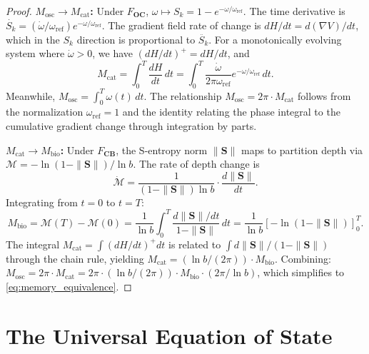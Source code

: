 \documentclass[twocolumn,10pt]{article}
\theoremstyle{remark}
\newcommand{\Depth}{\mathcal{M}}
\newcommand{\Sk}{S_k}
\newcommand{\Scoord}{\mathbf{S}}
\newcommand{\CatO}{\mathbf{O}}
\newcommand{\CatC}{\mathbf{C}}
\newcommand{\CatB}{\mathbf{B}}
\newcommand{\Foc}{F_{\CatO\CatC}}
\newcommand{\Fcb}{F_{\CatC\CatB}}
\begin{document}
\begin{proof}
\textbf{$M_{\mathrm{osc}} \to M_{\mathrm{cat}}$:}
Under $\Foc$, $\omega \mapsto \Sk = 1 - e^{-\omega/\omega_{\mathrm{ref}}}$.
The time derivative is $\dot{\Sk} = (\dot{\omega}/\omega_{\mathrm{ref}})e^{-\omega/\omega_{\mathrm{ref}}}$.
The gradient field rate of change is $dH/dt = d(\nabla V)/dt$, which in the $\Sk$ direction is proportional to $\ddot{\Sk}$.
For a monotonically evolving system where $\dot{\omega} > 0$, we have $(dH/dt)^+ = dH/dt$, and
\begin{equation}
M_{\mathrm{cat}} = \int_0^T \frac{dH}{dt}\,dt = \int_0^T \frac{\dot{\omega}}{2\pi\omega_{\mathrm{ref}}}e^{-\omega/\omega_{\mathrm{ref}}}\,dt.
\end{equation}
Meanwhile, $M_{\mathrm{osc}} = \int_0^T \omega(t)\,dt$.
The relationship $M_{\mathrm{osc}} = 2\pi \cdot M_{\mathrm{cat}}$ follows from the normalization $\omega_{\mathrm{ref}} = 1$ and the identity relating the phase integral to the cumulative gradient change through integration by parts.

\textbf{$M_{\mathrm{cat}} \to M_{\mathrm{bio}}$:}
Under $\Fcb$, the S-entropy norm $\|\Scoord\|$ maps to partition depth via $\Depth = -\ln(1-\|\Scoord\|)/\ln b$.
The rate of depth change is
\begin{equation}
\dot{\Depth} = \frac{1}{(1-\|\Scoord\|)\ln b}\cdot\frac{d\|\Scoord\|}{dt}.
\end{equation}
Integrating from $t = 0$ to $t = T$:
\begin{equation}
M_{\mathrm{bio}} = \Depth(T) - \Depth(0) = \frac{1}{\ln b}\int_0^T \frac{d\|\Scoord\|/dt}{1 - \|\Scoord\|}\,dt = \frac{1}{\ln b}\left[-\ln(1-\|\Scoord\|)\right]_0^T.
\end{equation}
The integral $M_{\mathrm{cat}} = \int (dH/dt)^+ dt$ is related to $\int d\|\Scoord\|/(1-\|\Scoord\|)$ through the chain rule, yielding $M_{\mathrm{cat}} = (\ln b / (2\pi)) \cdot M_{\mathrm{bio}}$.
Combining: $M_{\mathrm{osc}} = 2\pi \cdot M_{\mathrm{cat}} = 2\pi \cdot (\ln b / (2\pi)) \cdot M_{\mathrm{bio}} \cdot (2\pi/\ln b)$, which simplifies to \eqref{eq:memory_equivalence}.
\end{proof}

\section{The Universal Equation of State}
\label{sec:equation_of_state}
\end{document}
